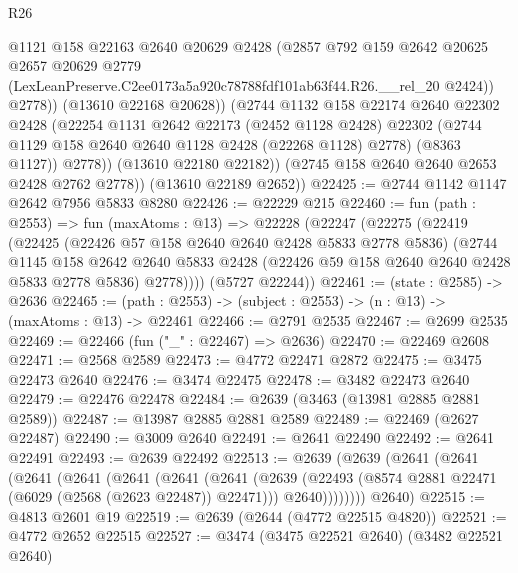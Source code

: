 \begin{lexlean}{R26}
\begin{coremodule}
                  @1121
                  @158
                  @22163
                  @2640
                  @20629
                  @2428
                  (@2857
                    @792
                    @159
                    @2642
                    @20625
                    @2657
                    @20629
                    @2779
                    (LexLeanPreserve.C2ee0173a5a920c78788fdf101ab63f44.R26.__rel_20 @2424))
                  @2778))
              (@13610 @22168 @20628))
            (@2744
              @1132
              @158
              @22174
              @2640
              @22302
              @2428
              (@22254
                @1131
                @2642
                @22173
                (@2452 @1128 @2428)
                @22302
                (@2744 @1129 @158 @2640 @2640 @1128 @2428 (@22268 @1128) @2778)
                (@8363 @1127))
              @2778))
          (@13610 @22180 @22182))
        (@2745 @158 @2640 @2640 @2653 @2428 @2762 @2778))
      (@13610 @22189 @2652))
@22425 := @2744 @1142 @1147 @2642 @7956 @5833 @8280
@22426 := @22229 @215
@22460 := fun (path : @2553) =>
  fun (maxAtoms : @13) =>
  @22228
    (@22247
      (@22275
        (@22419
          (@22425
            (@22426 @57 @158 @2640 @2640 @2428 @5833 @2778 @5836)
            (@2744
              @1145
              @158
              @2642
              @2640
              @5833
              @2428
              (@22426 @59 @158 @2640 @2640 @2428 @5833 @2778 @5836)
              @2778))))
      (@5727 @22244))
@22461 := (state : @2585) -> @2636
@22465 := (path : @2553) -> (subject : @2553) -> (n : @13) -> (maxAtoms : @13) -> @22461
@22466 := @2791 @2535
@22467 := @2699 @2535
@22469 := @22466 (fun ("_" : @22467) => @2636)
@22470 := @22469 @2608
@22471 := @2568 @2589
@22473 := @4772 @22471 @2872
@22475 := @3475 @22473 @2640
@22476 := @3474 @22475
@22478 := @3482 @22473 @2640
@22479 := @22476 @22478
@22484 := @2639 (@3463 (@13981 @2885 @2881 @2589))
@22487 := @13987 @2885 @2881 @2589
@22489 := @22469 (@2627 @22487)
@22490 := @3009 @2640
@22491 := @2641 @22490
@22492 := @2641 @22491
@22493 := @2639 @22492
@22513 := @2639
    (@2639
      (@2641
        (@2641
          (@2641
            (@2641
              (@2641
                (@2641
                  (@2641
                    (@2639
                      (@22493 (@8574 @2881 @22471 (@6029 (@2568 (@2623 @22487)) @22471)))
                      @2640))))))))
      @2640)
@22515 := @4813 @2601 @19
@22519 := @2639 (@2644 (@4772 @22515 @4820))
@22521 := @4772 @2652 @22515
@22527 := @3474 (@3475 @22521 @2640) (@3482 @22521 @2640)

\end{coremodule}
\end{lexlean}
